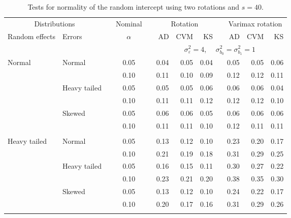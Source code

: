 \begin{table}[ht]
\caption{\label{tab:simb040}Tests for normality of the random intercept using two rotations and $s = 40$.}
\begin{scriptsize}
\begin{center}
\begin{tabular}{ll p{.1cm} c p{.1cm} rrr p{.1cm} rrr}
  \hline
  \multicolumn{2}{c}{Distributions}& & Nominal & &  \multicolumn{3}{c}{Rotation} & & \multicolumn{3}{c}{Varimax rotation} \\ \cline{1-2} \cline{6-8} \cline{10-12}   
  Random effects & Errors & & $\alpha$ & & AD & CVM & KS & & AD & CVM & KS \\ 
   \hline
& && && \multicolumn{7}{c}{$\sigma_{\varepsilon}^2 = 4$, \ \ $\sigma_{b_0}^2 = \sigma_{b_1}^2 = 1$} \\ \cline{6-12}
\rowcolor{gray!20}Normal       & Normal       && 0.05 &&   0.04 & 0.05 & 0.04 && 0.05 & 0.05 & 0.06 \\ 
\rowcolor{gray!20}             &              && 0.10 &&   0.11 & 0.10 & 0.09 && 0.12 & 0.12 & 0.11 \\ 
\rowcolor{gray!20}             & Heavy tailed && 0.05 &&   0.05 & 0.05 & 0.06 && 0.06 & 0.06 & 0.04 \\ 
\rowcolor{gray!20}             &              && 0.10 &&   0.11 & 0.11 & 0.12 && 0.12 & 0.12 & 0.10 \\ 
\rowcolor{gray!20}             & Skewed       && 0.05 &&   0.06 & 0.06 & 0.05 && 0.06 & 0.06 & 0.06 \\ 
\rowcolor{gray!20}             &              && 0.10 &&   0.11 & 0.11 & 0.10 && 0.12 & 0.11 & 0.11 \\ 
             &&&&&&&&&&&\\
Heavy tailed & Normal       && 0.05 &&   0.13 & 0.12 & 0.10 && 0.23 & 0.20 & 0.17 \\ 
             &              && 0.10 &&   0.21 & 0.19 & 0.18 && 0.31 & 0.29 & 0.25 \\ 
             & Heavy tailed && 0.05 &&   0.16 & 0.15 & 0.11 && 0.30 & 0.27 & 0.22 \\ 
             &              && 0.10 &&   0.23 & 0.21 & 0.20 && 0.38 & 0.35 & 0.30 \\ 
             & Skewed       && 0.05 &&   0.13 & 0.12 & 0.10 && 0.24 & 0.22 & 0.17 \\ 
             &              && 0.10 &&   0.20 & 0.17 & 0.16 && 0.31 & 0.29 & 0.26 \\ 
             &&&&&&&&&&&\\

\end{tabular}
\end{center}
\end{scriptsize}
\end{table}
